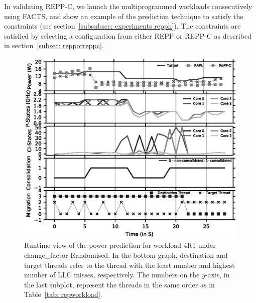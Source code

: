 In validating REPP-C, we launch the multiprogrammed workloads consecutively using FACTS,
and show an example of the prediction technique to satisfy the constraints (see
section~\ref{subsubsec: experiments repph}). The constraints are satisfied by selecting a
configuration from either REPP or REPP-C as described in section~\ref{subsec:
repporreppc}.

\begin{figure}[t]
    \centering
    \includegraphics[scale=0.9]{Chapter3/Figs/consolidation/4r1-random.eps}
    \caption[Power prediction for a random workload]{ Runtime view of the power prediction for workload 4R1 under change\_factor Randomised. In the bottom graph, destination and target threads refer to the thread with the least number and highest number of LLC misses, respectively. The numbers on the $y$-axis, in the last subplot, represent the threads in the same order as in Table~\ref{tab: repworkload}.}
    \label{fig: power realtime}
\end{figure}

